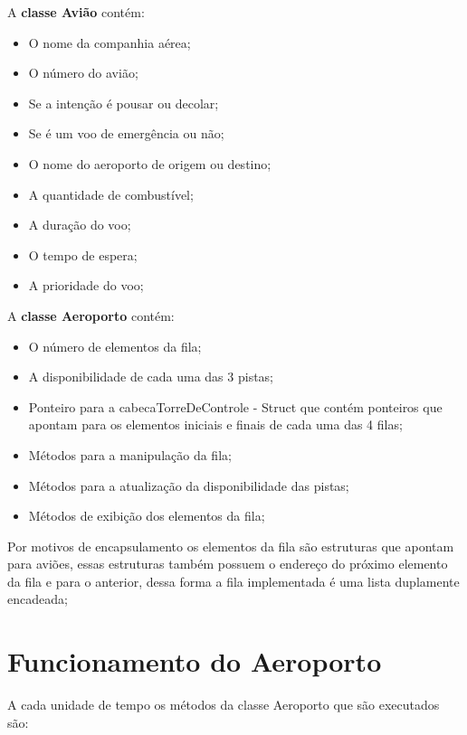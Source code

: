 \documentclass{article}
\begin{document}
A \textbf{classe Avião} contém:

\begin{itemize}
 \item O nome da companhia aérea;
 \item O número do avião;
 \item Se a intenção é pousar ou decolar;
 \item Se é um voo de emergência ou não;
 \item O nome do aeroporto de origem ou destino;
 \item A quantidade de combustível;
 \item A duração do voo;
 \item O tempo de espera;
 \item A prioridade do voo;
\end{itemize}

A \textbf{classe Aeroporto} contém:

\begin{itemize}
 \item O número de elementos da fila;
 \item A disponibilidade de cada uma das 3 pistas;
 \item Ponteiro para a cabecaTorreDeControle - Struct que contém ponteiros que apontam para os 
 elementos iniciais e finais de cada uma das 4 filas;
 \item Métodos para a manipulação da fila;
 \item Métodos para a atualização da disponibilidade das pistas;
 \item Métodos de exibição dos elementos da fila;
\end{itemize}

Por motivos de encapsulamento os elementos da fila são estruturas que apontam para aviões, essas estruturas também possuem o endereço do próximo elemento da fila e para o anterior, dessa forma a fila implementada é uma lista duplamente encadeada;

\section{Funcionamento do Aeroporto}
A cada unidade de tempo os métodos da classe Aeroporto que são executados são:
\end{document}

